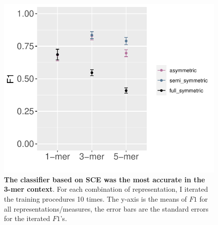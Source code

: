 \begin{figure}[h!]
    \centering
    \includegraphics[scale=1]{graphics/f1_sce.pdf}
    \caption{\textbf{The classifier based on SCE was the most accurate in the 3-mer context}. For each combination of representation, I iterated the training procedures 10 times. The y-axis is the means of $F1$ for all representations/measures, the error bars are the standard errors for the iterated $F1$'s.}
    \label{fig:f1_sce}
\end{figure}
